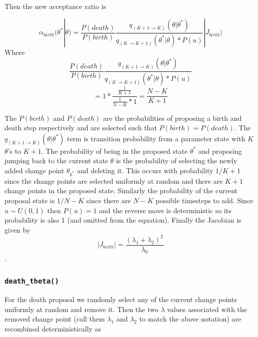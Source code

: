 \documentclass[11pt,a4paper]{article}
\numberwithin{equation}{section}
\begin{document}
Then the new acceptance ratio is

\[\alpha_{birth}(\theta^*|\theta) = \frac{P(death)}{P(birth)}\frac{q_{(K+1\rightarrow K)}(\theta|\theta^*)}{q_{(K\rightarrow K + 1)}(\theta^*|\theta)*P(u)}|J_{birth}|\]
Where
\[  \frac{P(death)}{P(birth)}\frac{q_{(K+1\rightarrow K)}(\theta|\theta^*)}{q_{(K\rightarrow K + 1)}(\theta^*|\theta)*P(u)} \]
\[= 1*\frac{\frac{1}{K+1}}{\frac{1}{N-K}*1} = \frac{N-K}{K+1} \]

The \(P(birth)\) and \(P(death)\) are the probabilities of proposing a
birth and death step respectively and are selected such that
\(P(birth) = P(death)\). The \(q_{(K+1\rightarrow K)}(\theta|\theta^*)\)
term is transition probability from a parameter state with \(K\)
\(\theta\)'s to \(K+1\). The probability of being in the proposed state
\(\theta^*\) and proposing jumping back to the current state \(\theta\)
is the probability of selecting the newly added change point
\(\theta_{k^*}\) and deleting it. This occurs with probability \(1/K+1\)
since the change points are selected uniformly at random and there are
\(K+1\) change points in the proposed state. Similarly the probability
of the current proposal state is \(1/N-K\) since there are \(N-K\)
possible timesteps to add. Since \(u \sim U(0,1)\) then \(P(u) = 1\) and
the reverse move is deterministic so its probability is also 1 (and
omitted from the equation). Finally the Jacobian is given by
\[ |J_{birth}| = \frac{(\lambda_1 + \lambda_2)^2}{\lambda_0}\] .

\hypertarget{death_theta}{%
\subsubsection{\texorpdfstring{\texttt{death\_theta()}}{death\_theta()}}\label{death_theta}}

For the death proposal we randomly select any of the current change
points uniformly at random and remove it. Then the two \(\lambda\)
values associated with the removed change point (call them \(\lambda_1\)
and \(\lambda_2\) to match the above notation) are recombined
deterministically as
\end{document}
